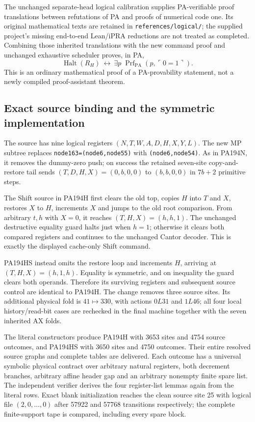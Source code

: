 The unchanged separate-head logical calibration supplies PA-verifiable
proof translations between refutations of PA and proofs of numerical
code one.  Its original mathematical texts are retained in
\texttt{references/logical/}; the supplied project's missing end-to-end
Lean/iPRA reductions are not treated as completed.  Combining those
inherited translations with the new command proof and unchanged exhaustive
scheduler proves, in PA,
\[
 \operatorname{Halt}(R_H)\ \longleftrightarrow\
 \exists p\;\operatorname{Prf}_{\mathrm{PA}}(p,\ulcorner0=1\urcorner).
\]
This is an ordinary mathematical proof of a PA-provability statement,
not a newly compiled proof-assistant theorem.

\subsection{Exact source binding and the symmetric implementation}

The source has nine logical registers $(N,T,W,A,D,H,X,Y,L)$.
The new MP subtree replaces \texttt{node163=(node6,node55)} with
\texttt{(node6,node54)}.  As in PA194N, it removes the dummy-zero push;
on success the retained seven-site copy-and-restore tail sends
$(T,D,H,X)=(0,b,0,0)$ to $(b,b,0,0)$ in $7b+2$ primitive steps.

The Shift source in PA194H first clears the old top, copies $H$ into $T$
and $X$, restores $X$ to $H$, increments $X$ and jumps to the old root
comparison.  From arbitrary $t,h$ with $X=0$, it reaches
$(T,H,X)=(h,h,1)$.  The unchanged destructive equality guard halts just
when $h=1$; otherwise it clears both compared registers and continues to
the unchanged Cantor decoder.  This is exactly the displayed cache-only
Shift command.

PA194HS instead omits the restore loop and increments $H$, arriving at
$(T,H,X)=(h,1,h)$.  Equality is symmetric, and on inequality the guard
clears both operands.  Therefore its surviving registers and subsequent
source control are identical to PA194H.  The change removes three source
sites.  Its additional physical fold is $41\mapsto330$, with actions
$0L31$ and $1L46$; all four local history/read-bit cases are rechecked in
the final machine together with the seven inherited AX folds.

The literal constructors produce PA194H with 3653 sites and 4754 source
outcomes, and PA194HS with 3650 sites and 4750 outcomes.  Their entire
resolved source graphs and complete tables are delivered.  Each outcome
has a universal symbolic physical contract over arbitrary natural
registers, both decrement branches, arbitrary affine header gap and an
arbitrary nonempty finite spare list.  The independent verifier derives
the four register-list lemmas again from the literal rows.  Exact blank
initialization reaches the clean source site 25 with logical file
$(2,0,\ldots,0)$ after 57922 and 57768 transitions respectively; the
complete finite-support tape is compared, including every spare block.

